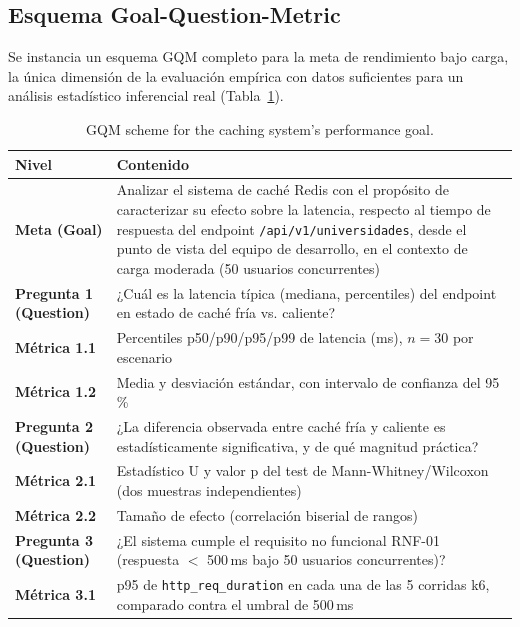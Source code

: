 \subsection{Esquema Goal-Question-Metric}

Se instancia un esquema GQM \cite{basili1994} completo para la meta de rendimiento bajo carga, la única
dimensión de la evaluación empírica con datos suficientes para un análisis estadístico inferencial real
(Tabla~\ref{tab:gqm}).

\begin{table}[H]
\centering
\small
\begin{tabular}{p{2cm}p{10cm}}
\toprule
\textbf{Nivel} & \textbf{Contenido} \\
\midrule
\textbf{Meta (Goal)} & Analizar el sistema de caché Redis con el propósito de caracterizar su efecto
sobre la latencia, respecto al tiempo de respuesta del endpoint \texttt{/api/v1/universidades}, desde el
punto de vista del equipo de desarrollo, en el contexto de carga moderada (50 usuarios concurrentes) \\
\textbf{Pregunta 1 (Question)} & ¿Cuál es la latencia típica (mediana, percentiles) del endpoint en
estado de caché fría vs. caliente? \\
\textbf{Métrica 1.1} & Percentiles p50/p90/p95/p99 de latencia (ms), $n=30$ por escenario \\
\textbf{Métrica 1.2} & Media y desviación estándar, con intervalo de confianza del 95\,\% \\
\textbf{Pregunta 2 (Question)} & ¿La diferencia observada entre caché fría y caliente es
estadísticamente significativa, y de qué magnitud práctica? \\
\textbf{Métrica 2.1} & Estadístico U y valor p del test de Mann-Whitney/Wilcoxon (dos muestras
independientes) \\
\textbf{Métrica 2.2} & Tamaño de efecto (correlación biserial de rangos) \\
\textbf{Pregunta 3 (Question)} & ¿El sistema cumple el requisito no funcional RNF-01 (respuesta $<$
500\,ms bajo 50 usuarios concurrentes)? \\
\textbf{Métrica 3.1} & p95 de \texttt{http\_req\_duration} en cada una de las 5 corridas k6, comparado
contra el umbral de 500\,ms \\
\bottomrule
\end{tabular}
\caption{GQM scheme for the caching system's performance goal.}
\label{tab:gqm}
\end{table}

